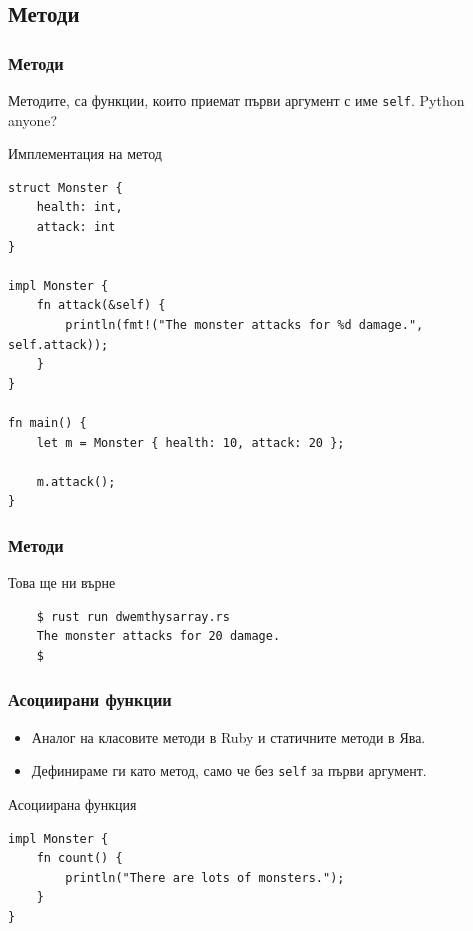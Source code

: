 \documentclass[xcolor=x11names,compress]{beamer}
\renewcommand{\(}{\begin{columns}}
\renewcommand{\)}{\end{columns}}
\newcommand{\<}[1]{\begin{column}{#1}}
\renewcommand{\>}{\end{column}}
\begin{document}
\subsection{Методи}
\begin{frame}[fragile]
  \frametitle{Методи}
  Методите, са функции, които приемат първи аргумент с име \texttt{self}. \pause Python anyone?

  \pause
  \begin{block}{Имплементация на метод}
    \begin{lstlisting}[basicstyle=\tiny]
struct Monster {
    health: int,
    attack: int
}

impl Monster {
    fn attack(&self) {
        println(fmt!("The monster attacks for %d damage.", self.attack));
    }
}

fn main() {
    let m = Monster { health: 10, attack: 20 };

    m.attack();
}
    \end{lstlisting}
  \end{block}
\end{frame}

\begin{frame}[fragile]
  \frametitle{Методи}

  Това ще ни върне

  \begin{lstlisting}
    $ rust run dwemthysarray.rs
    The monster attacks for 20 damage.
    $
  \end{lstlisting}
\end{frame}

\begin{frame}[fragile]
  \frametitle{Асоциирани функции}

  \pause
  \begin{itemize}[<+->]
  \item Аналог на класовите методи в Ruby и статичните методи в Ява.
  \item Дефинираме ги като метод, само че без \texttt{self} за първи аргумент.
  \end{itemize}

  \pause
  \begin{block}{Асоциирана функция}
    \begin{lstlisting}
impl Monster {
    fn count() {
        println("There are lots of monsters.");
    }
}
    \end{lstlisting}
  \end{block}
\end{frame}
\end{document}
